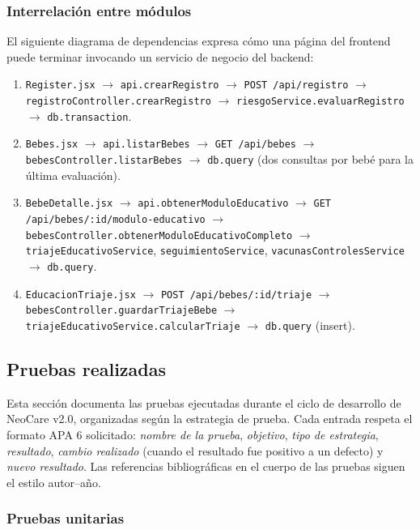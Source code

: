 \documentclass[12pt,letterpaper]{article}
\begin{document}
\subsubsection{Interrelación entre módulos}

El siguiente diagrama de dependencias expresa cómo una página del frontend puede terminar invocando un servicio de negocio del backend:

\begin{enumerate}
    \item \texttt{Register.jsx} $\to$ \texttt{api.crearRegistro} $\to$ \texttt{POST /api/registro} $\to$ \texttt{registroController.crearRegistro} $\to$ \texttt{riesgoService.evaluarRegistro} $\to$ \texttt{db.transaction}.
    \item \texttt{Bebes.jsx} $\to$ \texttt{api.listarBebes} $\to$ \texttt{GET /api/bebes} $\to$ \texttt{bebesController.listarBebes} $\to$ \texttt{db.query} (dos consultas por bebé para la última evaluación).
    \item \texttt{BebeDetalle.jsx} $\to$ \texttt{api.obtenerModuloEducativo} $\to$ \texttt{GET /api/bebes/:id/modulo-educativo} $\to$ \texttt{bebesController.obtenerModuloEducativoCompleto} $\to$ \texttt{triajeEducativoService}, \texttt{seguimientoService}, \texttt{vacunasControlesService} $\to$ \texttt{db.query}.
    \item \texttt{EducacionTriaje.jsx} $\to$ \texttt{POST /api/bebes/:id/triaje} $\to$ \texttt{bebesController.guardarTriajeBebe} $\to$ \texttt{triajeEducativoService.calcularTriaje} $\to$ \texttt{db.query} (insert).
\end{enumerate}

\subsection{Pruebas realizadas}

Esta sección documenta las pruebas ejecutadas durante el ciclo de desarrollo de NeoCare v2.0, organizadas según la estrategia de prueba. Cada entrada respeta el formato APA 6 solicitado: \textit{nombre de la prueba}, \textit{objetivo}, \textit{tipo de estrategia}, \textit{resultado}, \textit{cambio realizado} (cuando el resultado fue positivo a un defecto) y \textit{nuevo resultado}. Las referencias bibliográficas en el cuerpo de las pruebas siguen el estilo autor--año.

\subsubsection{Pruebas unitarias}
\end{document}
